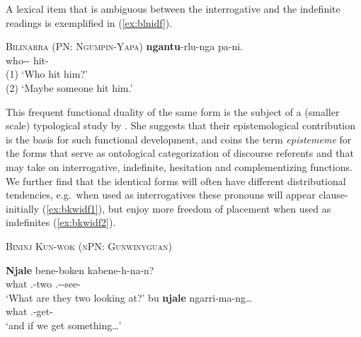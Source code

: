 \documentclass[12pt,egregdoesnotlikesansseriftitles]{scrartcl}
\begin{document}
A lexical item that is ambiguous between the interrogative and the indefinite readings is exemplified in (\ref{ex:blnidf}).

\begin{exe}
  \ex\label{ex:blnidf} \textsc{Bilinarra (PN: Ngumpin-Yapa)}\hfill {}
  \gll \textbf{ngantu}-rlu-nga pa-ni.\\
  who-\Erg-\Dub{} hit-\Pst{}\\
  \glt (1) `Who hit him?'\\
  (2) `Maybe someone hit him.'
\end{exe}

This frequent functional duality of the same form is the subject of a (smaller scale) typological study by \cite{mushin95}. She suggests that their epistemological contribution is the basis for such functional development, and coins the term \textit{epistememe} for the forms that serve as ontological categorization of discourse referents and that may take on interrogative, indefinite, hesitation and complementizing functions. We further find that the identical forms will often have different distributional tendencies, e.g.\ when used as interrogatives these pronouns will appear clause-initially (\ref{ex:bkwidf1}), but enjoy more freedom of placement when used as indefinites (\ref{ex:bkwidf2}).
\begin{exe}
  \ex\label{ex:bkwidf} \textsc{Bininj Kun-wok (nPN: Gunwinyguan)}\hfill {}
  \begin{xlist}
    \ex\gll \textbf{Njale} bene-boken kabene-h-na-n?\\
    what \Third.\Ua-two \Third.\Ua-\Imm-see-\Np\\
    `What are they two looking at?' \label{ex:bkwidf1} %
    \ex\gll bu \textbf{njale} ngarri-ma-ng\ldots\\
    \Sub{} what \First.\Aug-get-\Np\\
    `and if we get something\ldots' \label{ex:bkwidf2}%
  \end{xlist}
\end{exe}
\end{document}
